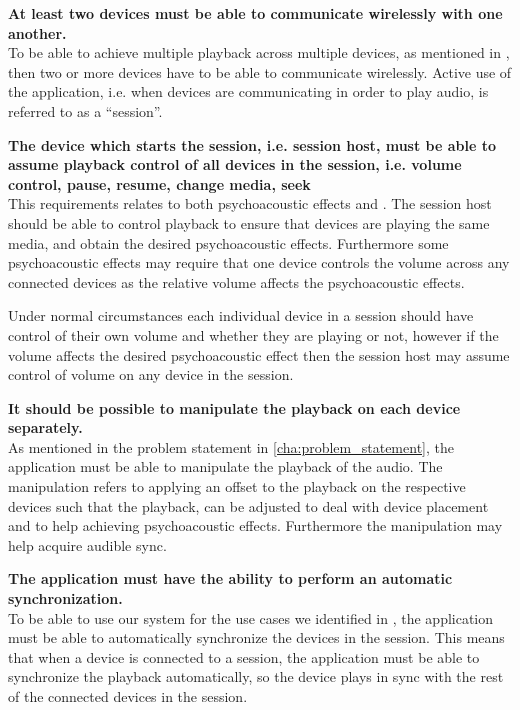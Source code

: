 \begin{eletterate}
    \item\label{req:wireless} \textbf{At least two devices must be able to communicate wirelessly with one another.} \hfill\\
        To be able to achieve multiple playback across multiple devices, as mentioned in ,
        then two or more devices have to be able to communicate wirelessly.
        Active use of the application, i.e. when devices are communicating in order to play audio, is referred to as a ``session''.

    \item\label{req:host_control} \textbf{The device which starts the session, i.e. session host, must be able to assume playback control of all devices in the session, i.e. volume control, pause, resume, change media, seek} \hfill\\
        This requirements relates to both psychoacoustic effects and .
        The session host should be able to control playback to ensure that devices are playing the same media, and obtain the desired psychoacoustic effects.
        Furthermore some psychoacoustic effects may require that one device controls the volume across any connected devices as the relative volume affects the psychoacoustic effects.

        Under normal circumstances each individual device in a session should have control of their own volume and whether they are playing or not, however if the volume affects the desired psychoacoustic effect then the session host may assume control of volume on any device in the session.

    \item\label{req:manipulate} \textbf{It should be possible to manipulate the playback on each device separately.} \hfill\\
        As mentioned in the problem statement in \cref{cha:problem_statement}, the application must be able to manipulate the playback of the audio.
        The manipulation refers to applying an offset to the playback on the respective devices such that the playback, can be adjusted to deal with device placement and to help achieving psychoacoustic effects.
        Furthermore the manipulation may help acquire audible sync.

    \item\label{req:sync} \textbf{The application must have the ability to perform an automatic synchronization.} \hfill\\
        To be able to use our system for the use cases we identified in ,
        the application must be able to automatically synchronize the devices in the session.
        This means that when a device is connected to a session, the application must be able to synchronize the playback automatically,
        so the device plays in sync with the rest of the connected devices in the session.


\end{eletterate}
